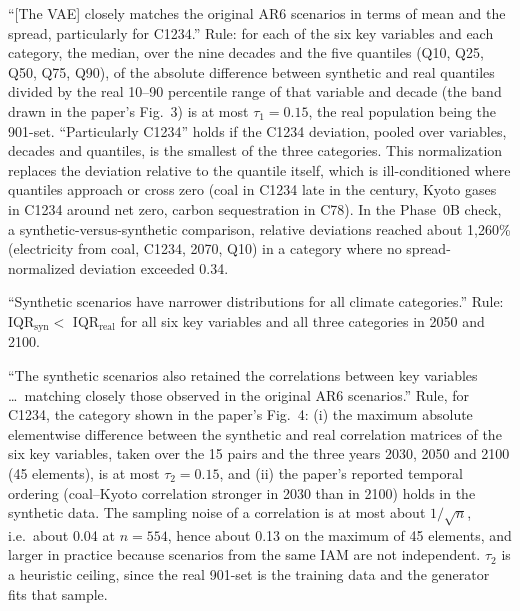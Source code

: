 \documentclass[11pt,a4paper]{article}
\newcommand{\prop}[1]{#1}
\newcommand{\prop}[1]{\textcolor{blue}{#1}}
\newcommand{\claim}[1]{\textbf{#1}}
\begin{document}
\begin{description}[style=nextline]
\item[\claim{X1a} (distributional match).] ``[The VAE] closely matches the
  original AR6 scenarios in terms of mean and the spread, particularly for
  C1234.'' Rule: for each of the six key variables and each category,
  \prop{the median, over the nine decades and the five quantiles (Q10, Q25,
  Q50, Q75, Q90), of the absolute difference between synthetic and real
  quantiles divided by the real 10--90 percentile range of that variable
  and decade (the band drawn in the paper's Fig.~3)} is at most
  $\tau_{1}=0.15$, the real population being the 901-set. ``Particularly
  C1234'' holds if the C1234 deviation, \prop{pooled over variables,
  decades and quantiles,} is the smallest of the three categories.
  \prop{This normalization replaces the deviation relative to the quantile
  itself, which is ill-conditioned where quantiles approach or cross zero
  (coal in C1234 late in the century, Kyoto gases in C1234 around net zero,
  carbon sequestration in C78). In the Phase~0B check, a
  synthetic-versus-synthetic comparison, relative deviations reached about
  1{,}260\% (electricity from coal, C1234, 2070, Q10) in a category where no
  spread-normalized deviation exceeded 0.34.}
\item[\claim{X1b} (narrower distributions).] ``Synthetic scenarios have
  narrower distributions for all climate categories.'' Rule:
  IQR$_{\mathrm{syn}} <$ IQR$_{\mathrm{real}}$ for all six key variables and
  all three categories in 2050 and 2100.
\item[\claim{X2} (correlation replication).] ``The synthetic scenarios also
  retained the correlations between key variables \dots\ matching closely
  those observed in the original AR6 scenarios.'' Rule, for C1234, the
  category shown in the paper's Fig.~4: (i) the maximum absolute
  elementwise difference between the synthetic and real correlation
  matrices of the six key variables, taken over the 15 pairs and the three
  years 2030, 2050 and 2100 (45 elements), is at most $\tau_{2}=0.15$, and
  (ii) the paper's reported temporal ordering (coal--Kyoto correlation
  stronger in 2030 than in 2100) holds in the synthetic data. The sampling
  noise of a correlation is at most about $1/\sqrt{n}$, i.e.\ about 0.04 at
  $n=554$, hence about 0.13 on the maximum of 45 elements, and larger in
  practice because scenarios from the same IAM are not independent.
  $\tau_{2}$ is a heuristic ceiling, since the real 901-set is the training
  data and the generator fits that sample.

\end{description}
\end{document}
